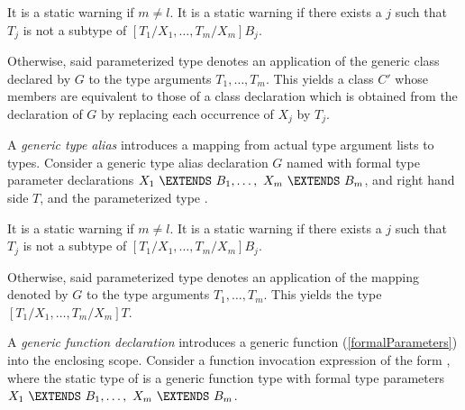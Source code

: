 \documentclass{article}
\begin{document}
\LMHash{}
It is a static warning if $m \not= l$.
It is a static warning if there exists a $j$
such that $T_j$ is not a subtype of $[T_1/X_1, \ldots, T_m/X_m]B_j$.


\LMHash{}
Otherwise, said parameterized type  denotes an application of the generic class declared by $G$ to the type arguments $T_1, \ldots, T_m$.
This yields a class $C'$ whose members are equivalent to those of a class declaration which is obtained from the declaration of $G$ by replacing each occurrence of $X_j$ by $T_j$.

\LMHash{}
A {\em generic type alias} introduces a mapping from actual type argument lists to types.
Consider a generic type alias declaration $G$ named  with formal type parameter declarations
$X_1\ \EXTENDS\ B_1, \ldots,\ X_m\ \EXTENDS\ B_m$,
and right hand side $T$,
and the parameterized type .

\LMHash{}
It is a static warning if $m \not= l$.
It is a static warning if there exists a $j$
such that $T_j$ is not a subtype of $[T_1/X_1, \ldots, T_m/X_m]B_j$.


\LMHash{}
Otherwise, said parameterized type
denotes an application of the mapping denoted by $G$ to the type arguments
$T_1, \ldots, T_m$.
This yields the type
$[T_1/X_1, \ldots, T_m/X_m]T$.


\LMHash{}
A {\em generic function declaration} introduces a generic function (\ref{formalParameters}) into the enclosing scope.
Consider a function invocation expression of the form
,
where the static type of  is a generic function type with formal type parameters
$X_1\ \EXTENDS\ B_1, \ldots,\ X_m\ \EXTENDS\ B_m$.
\end{document}
